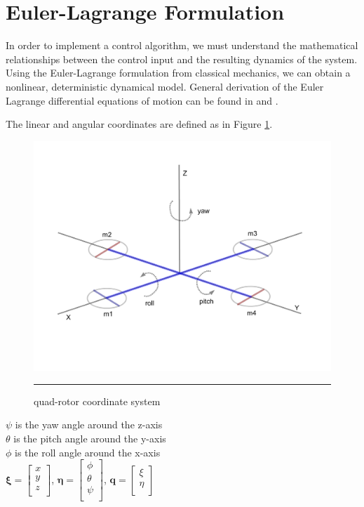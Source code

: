 \section{Euler-Lagrange Formulation}

In order to implement a control algorithm, we must understand the mathematical relationships between the control input and the resulting dynamics of the system. Using the Euler-Lagrange formulation from classical mechanics, we can obtain a nonlinear, deterministic dynamical model. General derivation of the Euler Lagrange differential equations of motion can be found in \cite{marion1995classical} and  \cite{cornelius1970variational}.

 The linear and angular coordinates are defined as in Figure \ref{fig:quad-rotor coordinate system}.

\begin{figure}[htbp]
	\centering
		\includegraphics[width=\textwidth]{Figures/coords.pdf}
		\rule{35em}{0.5pt}
	\caption[quad-rotor coordinate system]{quad-rotor coordinate system}
	\label{fig:quad-rotor coordinate system}
\end{figure}


\indent $ \psi $ is the yaw angle around the z-axis\\
\indent $ \theta $ is the pitch angle around the y-axis\\
\indent $ \phi $ is the roll angle around the x-axis\\

$\boldsymbol \xi = \left[ \begin{array}{c}
x\\y\\z\\
\end{array} \right] $, $\boldsymbol \eta =  \left[ \begin{array}{c}
\phi\\\theta\\\psi\\
\end{array} \right] $, $\boldsymbol q = \left[ \begin{array}{c}
\xi\\\eta\\
\end{array} \right]$\\

